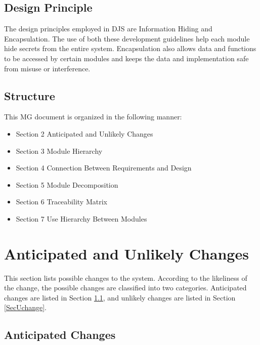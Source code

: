 \documentclass[12pt, titlepage]{article}
\begin{document}
\subsection{Design Principle}
The design principles employed in DJS are Information Hiding and Encapsulation. The use of both these development guidelines help each module hide secrets from the entire system. Encapsulation also allows data and functions to be accessed by certain modules and keeps the data and implementation safe from misuse or interference.
\subsection{Structure}
This MG document is organized in the following manner:
\renewcommand\labelitemii{$\square$}
\begin{itemize}


\item Section 2 Anticipated and Unlikely Changes
\item Section 3 Module Hierarchy


\item Section 4 Connection Between Requirements and Design


\item Section 5 Module Decomposition


\item Section 6 Traceability Matrix


\item Section 7 Use Hierarchy Between Modules




\end{itemize}




\section{Anticipated and Unlikely Changes} \label{SecChange}


This section lists possible changes to the system. According to the likeliness
of the change, the possible changes are classified into two
categories. Anticipated changes are listed in Section \ref{SecAchange}, and
unlikely changes are listed in Section \ref{SecUchange}.


\subsection{Anticipated Changes} \label{SecAchange}
\end{document}
